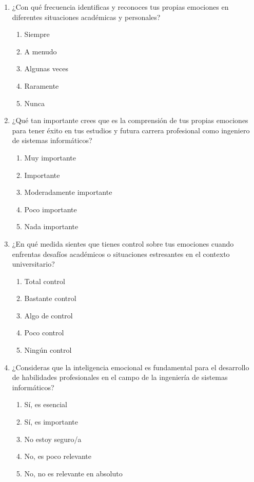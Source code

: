 \documentclass[journal]{IEEEtran}
\begin{document}
\begin{enumerate}
	\item ¿Con qué frecuencia identificas y reconoces tus propias emociones en diferentes situaciones académicas y personales?
	\begin{enumerate}
		\item Siempre
		\item A menudo
		\item Algunas veces
		\item Raramente
		\item Nunca
	\end{enumerate}
	
	\item ¿Qué tan importante crees que es la comprensión de tus propias emociones para tener éxito en tus estudios y futura carrera profesional como ingeniero de sistemas informáticos?
	\begin{enumerate}
		\item Muy importante
		\item Importante
		\item Moderadamente importante
		\item Poco importante
		\item Nada importante
	\end{enumerate}
	
	\item ¿En qué medida sientes que tienes control sobre tus emociones cuando enfrentas desafíos académicos o situaciones estresantes en el contexto universitario?
	\begin{enumerate}
		\item Total control
		\item Bastante control
		\item Algo de control
		\item Poco control
		\item Ningún control
	\end{enumerate}
	
	\item ¿Consideras que la inteligencia emocional es fundamental para el desarrollo de habilidades profesionales en el campo de la ingeniería de sistemas informáticos?
	\begin{enumerate}
		\item Sí, es esencial
		\item Sí, es importante
		\item No estoy seguro/a
		\item No, es poco relevante
		\item No, no es relevante en absoluto
	\end{enumerate}
	

\end{enumerate}
\end{document}
